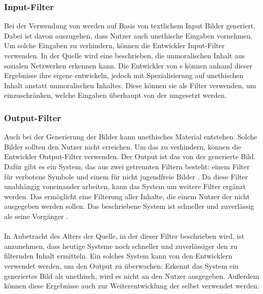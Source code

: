 \documentclass[hidelinks,12pt]{report}
\begin{document}
\subsubsection{Input-Filter}
Bei der Verwendung von  werden auf Basis von textlichem Input Bilder generiert. Dabei ist davon auszugehen, dass Nutzer auch unethische Eingaben vornehmen. Um solche Eingaben zu verhindern, können die Entwickler Input-Filter verwenden. In der Quelle \cite{Shah} wird eine  beschrieben, die unmoralischen Inhalt aus sozialen Netzwerken erkennen kann. Die Entwickler von s können anhand dieser Ergebnisse ihre eigene  entwickeln, jedoch mit Spezialisierung auf unethischen Inhalt anstatt unmoralischen Inhaltes. Diese  können sie als Filter verwenden, um einzuschränken, welche Eingaben überhaupt von der  umgesetzt werden.
\\
\subsubsection{Output-Filter}
Auch bei der Generierung der Bilder kann unethisches Material entstehen. Solche Bilder sollten den Nutzer nicht erreichen. Um das zu verhindern, können die Entwickler Output-Filter verwenden. Der Output ist das von der  generierte Bild. Dafür gibt es ein System, das aus zwei getrennten Filtern besteht: einem Filter für verbotene Symbole und einem für nicht jugendfreie Bilder \cite{Zheng}. Da diese Filter unabhängig voneinander arbeiten, kann das System um weitere Filter ergänzt werden. Das ermöglicht eine Filterung aller Inhalte, die einem Nutzer der  nicht ausgegeben werden sollen. Das beschriebene System ist schneller und zuverlässig als seine Vorgänger \cite{Zheng}.
\\\\
In Anbetracht des Alters der Quelle, in der dieser Filter beschrieben wird, ist anzunehmen, dass heutige Systeme noch schneller und zuverlässiger den zu filternden Inhalt ermitteln. Ein solches System kann von den Entwicklern verwendet werden, um den Output zu überwachen: Erkennt das System ein generiertes Bild als unethisch, wird es nicht an den Nutzer ausgegeben. Außerdem können diese Ergebnisse auch zur Weiterentwicklung der  selbst verwendet werden.
\\
\end{document}
